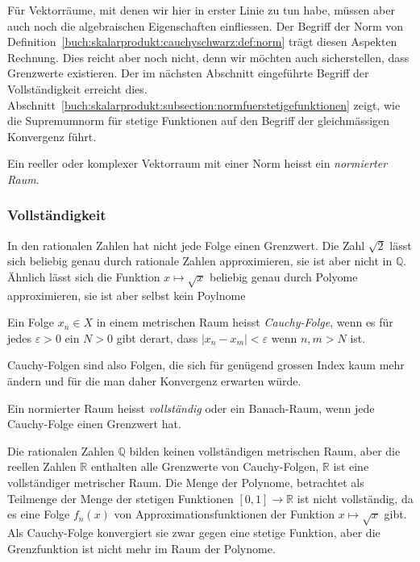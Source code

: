 Für Vektorräume, mit denen wir hier in erster Linie zu tun habe, 
müssen aber auch noch die algebraischen Eigenschaften einfliessen.
Der Begriff der Norm von
Definition~\ref{buch:skalarprodukt:cauchyschwarz:def:norm}
trägt diesen Aspekten Rechnung.
Dies reicht aber noch nicht, denn wir möchten auch sicherstellen,
dass Grenzwerte existieren.
Der im nächsten Abschnitt eingeführte Begriff der Vollständigkeit
erreicht dies.
Abschnitt~\ref{buch:skalarprodukt:subsection:normfuerstetigefunktionen}
zeigt, wie die Supremumnorm für stetige Funktionen auf den Begriff
der gleichmässigen Konvergenz führt.

\begin{definition}
Ein reeller oder komplexer Vektorraum mit einer Norm heisst ein
{\em normierter Raum}.
%
\end{definition}

%
%
\subsubsection{Vollständigkeit}
In den rationalen Zahlen hat nicht jede Folge einen Grenzwert.
Die Zahl $\!\sqrt{2}$ lässt sich beliebig genau durch rationale Zahlen
approximieren, sie ist aber nicht in $\mathbb{Q}$.
Ähnlich lässt sich die Funktion $x\mapsto \!\sqrt{x}$ beliebig genau 
durch Polyome approximieren, sie ist aber selbst kein Poylnome

\begin{definition}
Ein Folge $x_n\in X$ in einem metrischen Raum heisst {\em Cauchy-Folge},
%
wenn es für jedes $\varepsilon>0$ ein $N>0$ gibt derart, dass 
$|x_n-x_m|<\varepsilon$ wenn $n,m>N$ ist.
%
\end{definition}

Cauchy-Folgen sind also Folgen, die sich für genügend grossen Index
kaum mehr ändern und für die man daher Konvergenz erwarten würde.

\begin{definition}
Ein normierter Raum heisst {\em vollständig} oder ein Banach-Raum,
wenn jede Cauchy-Folge einen Grenzwert hat.
%
%
\end{definition}

Die rationalen Zahlen $\mathbb{Q}$ bilden keinen vollständigen
metrischen Raum, aber die reellen Zahlen $\mathbb{R}$ enthalten
alle Grenzwerte von Cauchy-Folgen, $\mathbb{R}$ ist eine vollständiger
metrischer Raum.
Die Menge der Polynome, betrachtet als Teilmenge der Menge der
stetigen Funktionen $[0,1]\to\mathbb{R}$ ist nicht vollständig,
da es eine Folge $f_n(x)$ von Approximationsfunktionen der Funktion
$x\mapsto \!\sqrt{x}$ gibt.
Als Cauchy-Folge konvergiert sie zwar gegen eine stetige Funktion,
aber die Grenzfunktion ist nicht mehr im Raum der Polynome.

